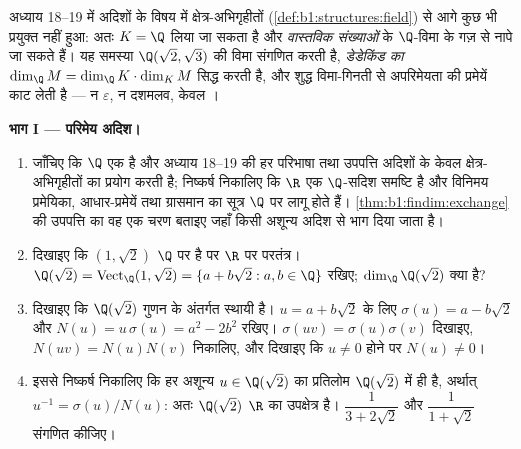 \begin{problem}\label{pb:b1:findim:1}
अध्याय 18--19 में अदिशों के विषय में क्षेत्र-अभिगृहीतों
(\cref{def:b1:structures:field}) से आगे कुछ भी प्रयुक्त नहीं हुआ: अतः $K =
\Q$ लिया जा सकता है और \emph{वास्तविक संख्याओं} के  $\Q$-विमा के गज़
से नापे जा सकते हैं। यह समस्या $\Q(\sqrt2, \sqrt3)$ की विमा संगणित करती है,
\emph{डेडेकिंड का } $\dim_\Q M = \dim_\Q K \cdot \dim_K M$ सिद्ध
करती है, और शुद्ध विमा-गिनती से अपरिमेयता की प्रमेयें काट लेती है --- न
$\varepsilon$, न दशमलव, केवल । 

\medskip \noindent\textbf{भाग I --- परिमेय अदिश।}
\begin{enumerate}
  \item जाँचिए कि $\Q$ एक  है और अध्याय 18--19 की हर परिभाषा तथा
  उपपत्ति अदिशों के केवल क्षेत्र-अभिगृहीतों का प्रयोग करती है; निष्कर्ष
  निकालिए कि $\R$ एक $\Q$-सदिश समष्टि है और विनिमय प्रमेयिका, आधार-प्रमेयें
  तथा ग्रासमान का सूत्र $\Q$ पर लागू होते हैं। \cref{thm:b1:findim:exchange}
  की उपपत्ति का वह एक चरण बताइए जहाँ किसी अशून्य अदिश से भाग दिया जाता है।
  \item दिखाइए कि $(1, \sqrt2)$ $\Q$ पर  है पर $\R$ पर परतंत्र।
  $\Q(\sqrt2) = \operatorname{Vect}_\Q(1, \sqrt2) = \{a + b\sqrt2 : a, b \in
  \Q\}$ रखिए; $\dim_\Q \Q(\sqrt2)$ क्या है?
  \item दिखाइए कि $\Q(\sqrt2)$ गुणन के अंतर्गत स्थायी है। $u = a + b\sqrt2$
  के लिए $\sigma(u) = a - b\sqrt2$ और $N(u) = u\,\sigma(u) = a^2 - 2b^2$
  रखिए। $\sigma(uv) = \sigma(u)\sigma(v)$ दिखाइए, $N(uv) = N(u)N(v)$
  निकालिए, और दिखाइए कि $u \neq 0$ होने पर $N(u) \neq 0$।
  \item इससे निष्कर्ष निकालिए कि हर अशून्य $u \in \Q(\sqrt2)$ का प्रतिलोम
  $\Q(\sqrt2)$ में ही है, अर्थात् $u^{-1} = \sigma(u)/N(u)$: अतः
  $\Q(\sqrt2)$ $\R$ का उपक्षेत्र है। $\dfrac1{3 + 2\sqrt2}$ और $\dfrac1{1 +
  \sqrt2}$ संगणित कीजिए।
\end{enumerate}


\end{problem}
